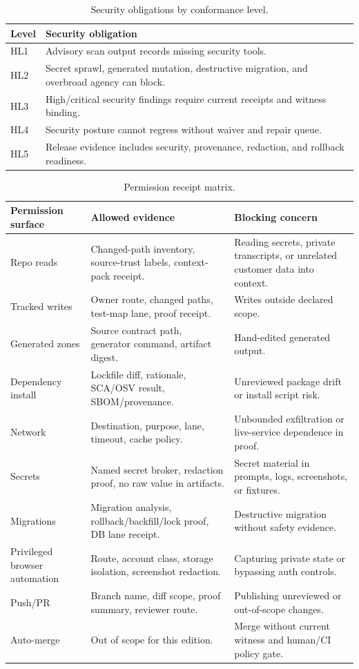 \begin{table}[t]
\caption{Security obligations by conformance level.}
\label{tab:security-hl-obligations}
\centering
\scriptsize
\begin{tabularx}{\columnwidth}{L{0.16\columnwidth} Y}
\toprule
\textbf{Level} & \textbf{Security obligation} \\
\midrule
HL1 & Advisory scan output records missing security tools. \\
HL2 & Secret sprawl, generated mutation, destructive migration, and overbroad agency can block. \\
HL3 & High/critical security findings require current receipts and witness binding. \\
HL4 & Security posture cannot regress without waiver and repair queue. \\
HL5 & Release evidence includes security, provenance, redaction, and rollback readiness. \\
\bottomrule
\end{tabularx}
\end{table}

\begin{table}[t]
\caption{Permission receipt matrix.}
\label{tab:permission-matrix}
\centering
\small
\begin{tabularx}{\textwidth}{L{0.22\textwidth} Y Y}
\toprule
\textbf{Permission surface} & \textbf{Allowed evidence} & \textbf{Blocking concern} \\
\midrule
Repo reads & Changed-path inventory, source-trust labels, context-pack receipt. & Reading secrets, private transcripts, or unrelated customer data into context. \\
Tracked writes & Owner route, changed paths, test-map lane, proof receipt. & Writes outside declared scope. \\
Generated zones & Source contract path, generator command, artifact digest. & Hand-edited generated output. \\
Dependency install & Lockfile diff, rationale, SCA/OSV result, SBOM/provenance. & Unreviewed package drift or install script risk. \\
Network & Destination, purpose, lane, timeout, cache policy. & Unbounded exfiltration or live-service dependence in proof. \\
Secrets & Named secret broker, redaction proof, no raw value in artifacts. & Secret material in prompts, logs, screenshots, or fixtures. \\
Migrations & Migration analysis, rollback/backfill/lock proof, DB lane receipt. & Destructive migration without safety evidence. \\
Privileged browser automation & Route, account class, storage isolation, screenshot redaction. & Capturing private state or bypassing auth controls. \\
Push/PR & Branch name, diff scope, proof summary, reviewer route. & Publishing unreviewed or out-of-scope changes. \\
Auto-merge & Out of scope for this edition. & Merge without current witness and human/CI policy gate. \\
\bottomrule
\end{tabularx}
\end{table}

